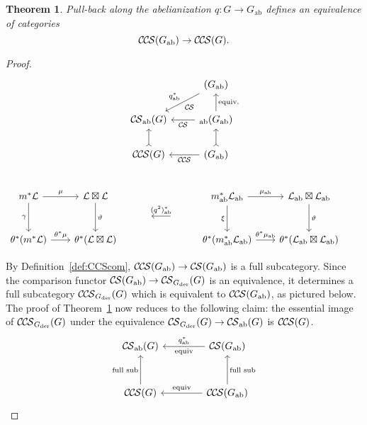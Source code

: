 \documentclass[10pt]{amsart}
\theoremstyle{plain}
\newtheorem{theorem}{Theorem}[section]
\theoremstyle{definition}
\newcommand{\Fq}{k}
\newcommand{\der}{_{\operatorname{der}}}
\newcommand{\ab}{_{\operatorname{ab}}}
\newcommand{\cs}[1]{{\mathcal{#1}}}
\newcommand{\CS}{{\mathcal{C\hskip-0.8pt S}}}
\newcommand{\CCS}{{\mathcal{C\hskip-.8pt C\hskip-0.8pt S}}}
\newcommand{\CSab}{\CS_{\operatorname{ab}}}
\begin{document}
\begin{theorem}\label{thm:Gab}
Pull-back along the abelianization $q : G \to G\ab$
defines an equivalence of categories 
\[
\CCS(G\ab) \to \CCS(G).
\]
\end{theorem}

\begin{proof}
\[
\begin{tikzcd}
{} & \arrow{dl}[swap]{q^*\ab} \CS(G\ab)\\
\CS\ab(G) & \arrow{l} \CS\ab(G\ab) \arrow{u}[swap]{\text{equiv.}}\\
\CCS(G) \arrow[>->]{u} & \arrow{l} \CCS(G\ab) \arrow[>->]{u}\\
\end{tikzcd}
\]
\[
  \begin{tikzcd}[row sep=10, column sep = 20]
   m^*\cs{L} \arrow{dd}[swap]{\gamma} \arrow{r}{\mu} 
 & \cs{L}\boxtimes\cs{L} \arrow{dd}{\vartheta}
 &&&  m\ab^*\cs{L}\ab \arrow{dd}[swap]{\xi} \arrow{r}{\mu\ab} 
   & \cs{L}\ab\boxtimes\cs{L}\ab \arrow{dd}{\vartheta}\\
%
 && \  &\arrow{l}[swap]{(q^2)^*\ab}  & & &\\ 
%
   \theta^*(m^*\cs{L}) \arrow{r}{{\theta}^*\mu} 
&  \theta^*(\cs{L}\boxtimes\cs{L}) 
 &&&   \theta^*(m\ab^*\cs{L}\ab) \arrow{r}{{\theta}^*\mu\ab} 
 &  \theta^*(\cs{L}\ab\boxtimes\cs{L}\ab)
 \end{tikzcd}
\]


By Definition~\ref{def:CCScom}, $\CCS(G\ab) \to \CS(G\ab)$ is a full subcategory.
Since the comparison functor $\CS(G\ab) \to \CS_{G\der}(G)$ is an equivalence, it determines a full subcategory $\CCS_{G\der}(G)$ which is equivalent to $\CCS(G\ab)$, as pictured below.
The proof of Theorem~\ref{thm:Gab} now reduces to the following claim: the essential image of $\CCS_{G\der}(G)$ under the equivalence $\CS_{G\der}(G) \to \CSab(G)$ is $\CCS(G)$.
\[
\begin{tikzcd}[row sep=30, column sep=40]
\CSab(G) & \CS(G\ab) \arrow{l}{\text{equiv}}[swap]{q\ab^*} \\
\CCS(G) \arrow{u}{\text{full sub}} & \CCS(G\ab) \arrow{u}[swap]{\text{full sub}} \arrow{l}[swap]{\text{equiv}}
\end{tikzcd}
\]


\end{proof}
\end{document}
